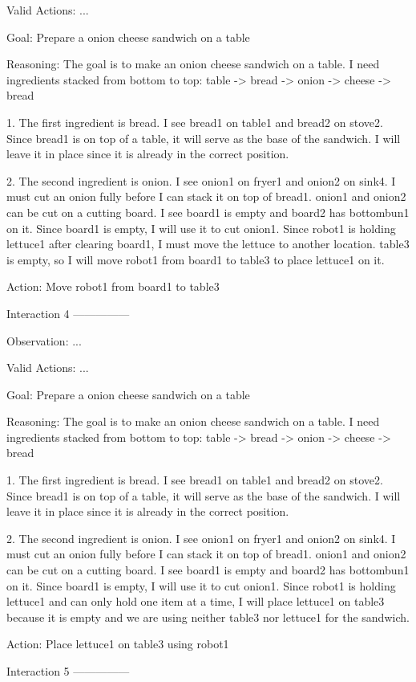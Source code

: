 Valid Actions:
...

Goal: Prepare a onion cheese sandwich on a table


Reasoning: The goal is to make an onion cheese sandwich on a table. I need ingredients stacked from bottom to top: table -> bread -> onion -> cheese -> bread

1. The first ingredient is bread. I see bread1 on table1 and bread2 on stove2. Since bread1 is on top of a table, it will serve as the base of the sandwich. I will leave it in place since it is already in the correct position.

2. The second ingredient is onion. I see onion1 on fryer1 and onion2 on sink4. I must cut an onion fully before I can stack it on top of bread1. onion1 and onion2 can be cut on a cutting board. I see board1 is empty and board2 has bottombun1 on it. Since board1 is empty, I will use it to cut onion1. Since robot1 is holding lettuce1 after clearing board1, I must move the lettuce to another location. table3 is empty, so I will move robot1 from board1 to table3 to place lettuce1 on it.

Action: Move robot1 from board1 to table3


Interaction 4
---------------


Observation:
...

Valid Actions:
...

Goal: Prepare a onion cheese sandwich on a table


Reasoning: The goal is to make an onion cheese sandwich on a table. I need ingredients stacked from bottom to top: table -> bread -> onion -> cheese -> bread

1. The first ingredient is bread. I see bread1 on table1 and bread2 on stove2. Since bread1 is on top of a table, it will serve as the base of the sandwich. I will leave it in place since it is already in the correct position.

2. The second ingredient is onion. I see onion1 on fryer1 and onion2 on sink4. I must cut an onion fully before I can stack it on top of bread1. onion1 and onion2 can be cut on a cutting board. I see board1 is empty and board2 has bottombun1 on it. Since board1 is empty, I will use it to cut onion1. Since robot1 is holding lettuce1 and can only hold one item at a time, I will place lettuce1 on table3 because it is empty and we are using neither table3 nor lettuce1 for the sandwich.

Action: Place lettuce1 on table3 using robot1


Interaction 5
---------------


